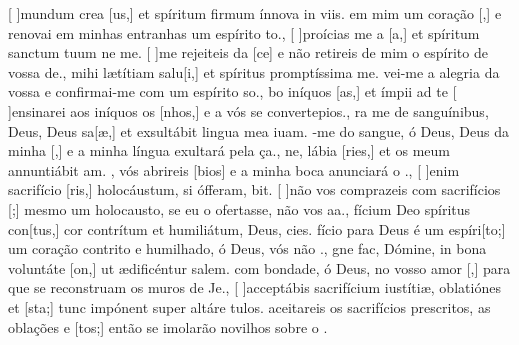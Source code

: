 {  %
  {[ ]{mun}dum crea [us,] et spíritum firmum ínnova in viis.}%
    { em mim um coração [,] e renovai em minhas entranhas um espírito to.},
  {[ ]{pro}ícias me a [a,] et spíritum sanctum tuum ne  me.}%
    {[ ]{me} rejeiteis da [ce] e não retireis de mim o espírito de vossa de.},
  { mihi lætítiam salu[i,] et spíritus promptíssima me.}%
    {vei-me a alegria da vossa  e confir\-mai-me com um espírito so.},
  {bo iníquos [as,] et ímpii ad te }%
    {[ ]{en}sinarei aos iníquos os [nhos,] e a vós se convertepios.},
  {ra me de sanguínibus, Deus, Deus sa[æ,] et exsultábit lingua mea iuam.}%
    {-me do sangue, ó Deus, Deus da minha [,] e a minha língua exultará pela ça.},
  {ne, lábia [ries,] et os meum annuntiábit am.}%
    {, vós abrireis [bios] e a minha boca anunciará o .},
  {[ ]{e}nim sacrifício [ris,] holocáustum, si ófferam, bit.}%
    {[ ]{não} vos comprazeis com sacrifícios [;] mesmo um holocausto, se eu o ofertasse, não vos aa.},
  {fícium Deo spíritus con[tus,] cor contrítum et humiliátum, Deus, cies.}%
    {fício para Deus é um espíri[to;] um coração contrito e humilhado, ó Deus, vós não .},
  {gne fac, Dómine, in bona voluntáte [on,] ut ædificéntur salem.}%
    { com bondade, ó Deus, no vosso amor [,] para que se reconstruam os muros de Je.},
  {[ ]{ac}ceptábis sacrifícium iustítiæ, oblatiónes et [\-sta;] tunc impónent super altáre tu\-los.}%
    { aceitareis os sacrifícios prescritos, as oblações e [tos;] então se imolarão novilhos sobre o .}
}